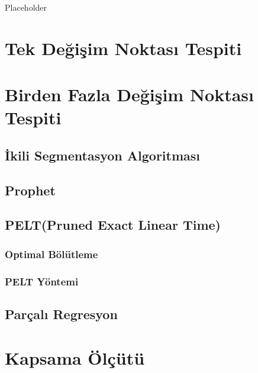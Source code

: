 \documentclass[12pt,twoside]{deuthesis}
\begin{document}
Placeholder

\hypertarget{tek-deux11fiux15fim-noktasux131-tespiti}{%
\section{Tek Değişim Noktası Tespiti}\label{tek-deux11fiux15fim-noktasux131-tespiti}}

\hypertarget{birden-fazla-deux11fiux15fim-noktasux131-tespiti}{%
\section{Birden Fazla Değişim Noktası Tespiti}\label{birden-fazla-deux11fiux15fim-noktasux131-tespiti}}

\hypertarget{ikili-segmentasyon-algoritmasux131}{%
\subsection{İkili Segmentasyon Algoritması}\label{ikili-segmentasyon-algoritmasux131}}

\hypertarget{prophet}{%
\subsection{Prophet}\label{prophet}}

\hypertarget{peltpruned-exact-linear-time}{%
\subsection{PELT(Pruned Exact Linear Time)}\label{peltpruned-exact-linear-time}}

\hypertarget{optimal-buxf6luxfctleme}{%
\subsubsection{Optimal Bölütleme}\label{optimal-buxf6luxfctleme}}

\hypertarget{pelt-yuxf6ntemi}{%
\subsubsection{PELT Yöntemi}\label{pelt-yuxf6ntemi}}

\hypertarget{paruxe7alux131-regresyon}{%
\subsection{Parçalı Regresyon}\label{paruxe7alux131-regresyon}}

\hypertarget{kapsama-uxf6luxe7uxfctuxfc}{%
\section{Kapsama Ölçütü}\label{kapsama-uxf6luxe7uxfctuxfc}}
\end{document}

